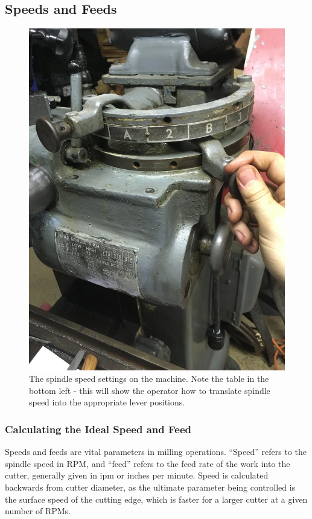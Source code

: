 \documentclass[12pt,twoside,letterpaper]{article}
\begin{document}
\subsection{Speeds and Feeds}
\begin{figure}[H]
\centering
\includegraphics[width=5in]{speedSetting}
\caption{The spindle speed settings on the machine. Note the table in the bottom left - this will show the operator how to translate spindle speed into the appropriate lever positions.}
\end{figure}

\subsubsection{Calculating the Ideal Speed and Feed}

Speeds and feeds are vital parameters in milling operations. ``Speed'' refers to the spindle speed in RPM, and ``feed'' refers to the feed rate of the work into the cutter, generally given in ipm or inches per minute. Speed is calculated backwards from cutter diameter, as the ultimate parameter being controlled is the surface speed of the cutting edge, which is faster for a larger cutter at a given number of RPMs.
\end{document}
